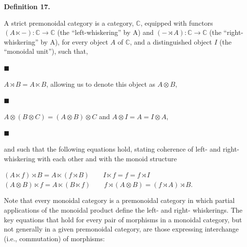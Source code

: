 \documentclass[10pt,a4paper]{article}
\begin{document}
\par\medskip\noindent\textbf{Definition 17.}\par
 
 
A strict premonoidal category is a category, $\mathbb{C}$, equipped with functors $(A\ltimes-):\mathbb{C}\to\mathbb{C}$ (the “left-whiskering” by A) and $(-\rtimes A):\mathbb{C}\to\mathbb{C}$ (the “right-whiskering” by A), for every object $A$ of $\mathbb{C}$, and a distinguished object $I$ (the “monoidal unit”), such that,\par
  
\par\noindent  $\blacksquare$ 
 
$A\rtimes B=A\ltimes B$, allowing us to denote this object as $A\otimes B$,\par
 
 
 
\par\noindent  $\blacksquare$ 
 
$A\otimes(B\otimes C)=(A\otimes B)\otimes C$ and $A\otimes I=A=I\otimes A$,\par
 
 
 
\par\noindent  $\blacksquare$ 
 
and such that the following equations hold, stating coherence of left- and right-whiskering with each other and with the monoid structure\par
    $\displaystyle(A\ltimes f)\rtimes B=A\ltimes(f\rtimes B)\qquad I\ltimes f=f=f\rtimes
I$     $\displaystyle(A\otimes B)\ltimes f=A\ltimes(B\ltimes f)\qquad f\rtimes(A\otimes B)=(f\rtimes A)\rtimes B.$    
 
 
\par
 
 
  
 
 
 
Note that every monoidal category is a premonoidal category in which partial applications of the monoidal product define the left- and right- whiskerings. The key equations that hold for every pair of morphisms in a monoidal category, but not generally in a given premonoidal category, are those expressing interchange (i.e., commutation) of morphisms:\par
 
\end{document}
